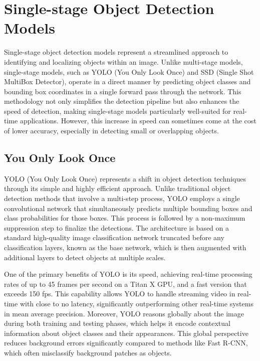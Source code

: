 \newpage
\section{Single-stage Object Detection Models}

Single-stage object detection models represent a streamlined approach to identifying and localizing objects within an image. Unlike multi-stage models, 
single-stage models, such as YOLO (You Only Look Once) and SSD (Single Shot MultiBox Detector), operate in a direct manner by predicting object classes and 
bounding box coordinates in a single forward pass through the network. This methodology not only simplifies the detection pipeline but also enhances the 
speed of detection, making single-stage models particularly well-suited for real-time applications. However, this increase in speed can sometimes come at 
the cost of lower accuracy, especially in detecting small or overlapping objects.

\subsection{You Only Look Once}

YOLO (You Only Look Once) \cite{yolo} represents a shift in object detection techniques through its simple and highly efficient approach. Unlike traditional 
object detection methods that involve a multi-step process, YOLO employs a single convolutional network that simultaneously predicts multiple bounding boxes 
and class probabilities for those boxes. This process is followed by a non-maximum suppression step to finalize the detections. The architecture is based on a 
standard high-quality image classification network truncated before any classification layers, known as the base network, which is then augmented with additional 
layers to detect objects at multiple scales.

One of the primary benefits of YOLO is its speed, achieving real-time processing rates of up to 45 frames per second on a Titan X GPU, and a fast 
version that exceeds 150 fps. This capability allows YOLO to handle streaming video in real-time with close to no latency, significantly outperforming other 
real-time systems in mean average precision. Moreover, YOLO reasons globally about the image during both training and testing phases, which helps it encode 
contextual information about object classes and their appearances. This global perspective reduces background errors significantly compared to methods like 
Fast R-CNN, which often misclassify background patches as objects.

